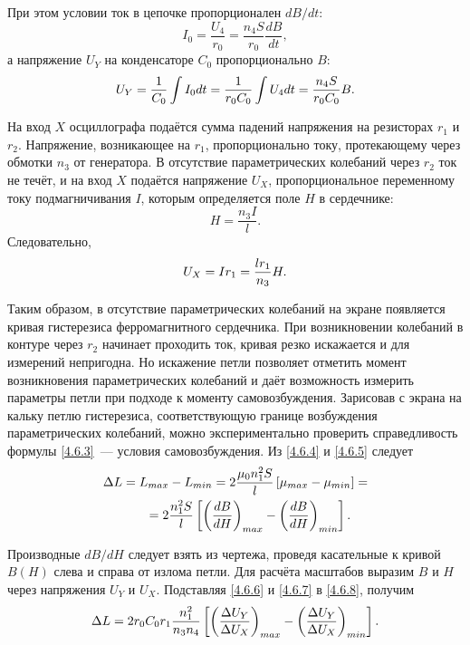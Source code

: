  При этом условии ток в цепочке пропорционален $dB/dt$: 
\begin{equation*}
	I_0 = \frac{U_4}{r_0} = \frac{n_4S}{r_0}\frac{dB}{dt},
\end{equation*}
а напряжение $U_Y$ на конденсаторе $C_0$ пропорционально $B$: 
\begin{equation}
	\eqmark{4.6.6}
	U_Y = \frac{1}{C_0}\int I_0dt = \frac{1}{r_0C_0}\int U_4dt = \frac{n_4S}{r_0C_0}B.
\end{equation}

На вход $X$ осциллографа подаётся сумма падений напряжения на резисторах $r_1$ и $r_2$. Напряжение, возникающее на $r_1$, пропорционально току, протекающему через обмотки $n_3$ от генератора. В отсутствие параметрических колебаний через $r_2$ ток не течёт, и на вход $X$ подаётся напряжение $U_X$, пропорциональное переменному току подмагничивания $I$, которым определяется поле $H$ в сердечнике: 
\begin{equation*}
	H = \frac{n_3I}{l}.
\end{equation*}
Следовательно, 
\begin{equation}
	\eqmark{4.6.7}
	U_X = Ir_1 = \frac{lr_1}{n_3}H.
\end{equation}

Таким образом, в отсутствие параметрических колебаний на экране появляется кривая гистерезиса ферромагнитного сердечника. При возникновении колебаний в контуре через $r_2$ начинает проходить ток, кривая резко искажается и для измерений непригодна. Но искажение петли позволяет отметить момент возникновения параметрических колебаний и даёт возможность измерить параметры петли при подходе к моменту самовозбуждения. Зарисовав с экрана на кальку петлю гистерезиса, соответствующую границе возбуждения параметрических колебаний, можно экспериментально проверить справедливость формулы \eqref{4.6.3}~--- условия самовозбуждения. Из \eqref{4.6.4} и \eqref{4.6.5} следует 
\begin{equation}
	\eqmark{4.6.8}
	\begin{aligned}
		\Delta L = L_{max}& - L_{min} = 2\frac{\mu_0n^2_1S}{l}\left[\mu_{max} - \mu_{min}\right] = \\	
		= 2&\frac{n^2_1S}{l}\left[\left(\frac{dB}{dH}\right)_{max} - \left(\frac{dB}{dH}\right)_{min}\right].
	\end{aligned}
\end{equation}

Производные $dB/dH$ следует взять из чертежа, проведя касательные к кривой $B(H)$ слева и справа от излома петли. Для расчёта масштабов выразим $B$ и $H$ через напряжения $U_Y$ и $U_X$. Подставляя \eqref{4.6.6} и \eqref{4.6.7} в \eqref{4.6.8}, получим 
\begin{equation}
	\eqmark{4.6.9}
	\Delta L = 2r_0C_0r_1\frac{n^2_1}{n_3n_4}\left[\left(\frac{\Delta U_Y}{\Delta U_X}\right)_{max} - \left(\frac{\Delta U_Y}{\Delta U_X}\right)_{min}\right].
\end{equation}

